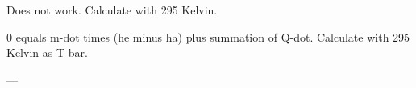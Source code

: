 Does not work.  
Calculate with 295 Kelvin.  

0 equals m-dot times (he minus ha) plus summation of Q-dot.  
Calculate with 295 Kelvin as T-bar.  

---